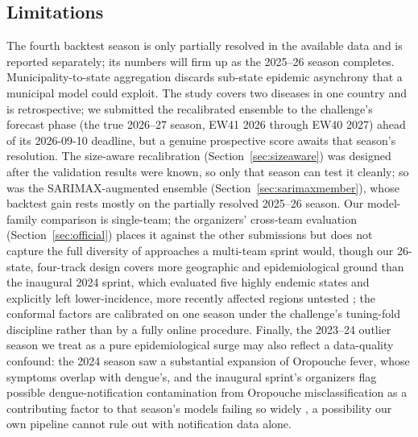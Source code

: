 \documentclass[11pt]{article}
\begin{document}
\subsection{Limitations}
The fourth backtest season is only partially resolved in the available data and is reported
separately; its numbers will firm up as the 2025--26 season completes. Municipality-to-state
aggregation discards sub-state epidemic asynchrony that a municipal model could exploit. The study
covers two diseases in one country and is retrospective; we submitted the recalibrated ensemble to
the challenge's forecast phase (the true 2026--27 season, EW41 2026 through EW40 2027) ahead of its
2026-09-10 deadline, but a genuine prospective score awaits that season's resolution. The
size-aware recalibration (Section~\ref{sec:sizeaware}) was designed after the validation results
were known, so only that season can test it cleanly; so was the SARIMAX-augmented ensemble
(Section~\ref{sec:sarimaxmember}), whose backtest gain rests mostly on the partially resolved
2025--26 season. Our
model-family comparison is single-team; the organizers' cross-team evaluation
(Section~\ref{sec:official}) places it against the other submissions but does not capture the full diversity
of approaches a multi-team sprint would, though our 26-state, four-track design covers more
geographic and epidemiological ground than the inaugural 2024 sprint, which evaluated five highly
endemic states and explicitly left lower-incidence, more recently affected regions untested
\citep{araujo2026}; the conformal factors are calibrated on one season under
the challenge's tuning-fold discipline rather than by a fully online procedure. Finally, the
2023--24 outlier season we treat as a pure epidemiological surge may also reflect a data-quality
confound: the 2024 season saw a substantial expansion of Oropouche fever, whose symptoms overlap
with dengue's, and the inaugural sprint's organizers flag possible dengue-notification
contamination from Oropouche misclassification as a contributing factor to that season's models
failing so widely \citep{araujo2026}, a possibility our own pipeline cannot rule out with
notification data alone.
\end{document}
